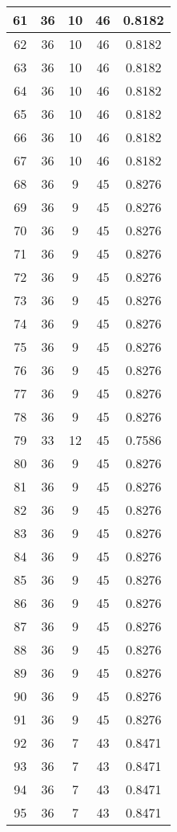 \documentclass[letterpaper, 12pt]{article}
\begin{document}
\begin{longtable}{|c|c|c|c|c|}
61 & 36 & 10 & 46 & 0.8182 \\
\hline
62 & 36 & 10 & 46 & 0.8182 \\
\hline
63 & 36 & 10 & 46 & 0.8182 \\
\hline
64 & 36 & 10 & 46 & 0.8182 \\
\hline
65 & 36 & 10 & 46 & 0.8182 \\
\hline
66 & 36 & 10 & 46 & 0.8182 \\
\hline
67 & 36 & 10 & 46 & 0.8182 \\
\hline
68 & 36 & 9 & 45 & 0.8276 \\
\hline
69 & 36 & 9 & 45 & 0.8276 \\
\hline
70 & 36 & 9 & 45 & 0.8276 \\
\hline
71 & 36 & 9 & 45 & 0.8276 \\
\hline
72 & 36 & 9 & 45 & 0.8276 \\
\hline
73 & 36 & 9 & 45 & 0.8276 \\
\hline
74 & 36 & 9 & 45 & 0.8276 \\
\hline
75 & 36 & 9 & 45 & 0.8276 \\
\hline
76 & 36 & 9 & 45 & 0.8276 \\
\hline
77 & 36 & 9 & 45 & 0.8276 \\
\hline
78 & 36 & 9 & 45 & 0.8276 \\
\hline
79 & 33 & 12 & 45 & 0.7586 \\
\hline
80 & 36 & 9 & 45 & 0.8276 \\
\hline
81 & 36 & 9 & 45 & 0.8276 \\
\hline
82 & 36 & 9 & 45 & 0.8276 \\
\hline
83 & 36 & 9 & 45 & 0.8276 \\
\hline
84 & 36 & 9 & 45 & 0.8276 \\
\hline
85 & 36 & 9 & 45 & 0.8276 \\
\hline
86 & 36 & 9 & 45 & 0.8276 \\
\hline
87 & 36 & 9 & 45 & 0.8276 \\
\hline
88 & 36 & 9 & 45 & 0.8276 \\
\hline
89 & 36 & 9 & 45 & 0.8276 \\
\hline
90 & 36 & 9 & 45 & 0.8276 \\
\hline
91 & 36 & 9 & 45 & 0.8276 \\
\hline
92 & 36 & 7 & 43 & 0.8471 \\
\hline
93 & 36 & 7 & 43 & 0.8471 \\
\hline
94 & 36 & 7 & 43 & 0.8471 \\
\hline
95 & 36 & 7 & 43 & 0.8471 \\

\end{longtable}
\end{document}
